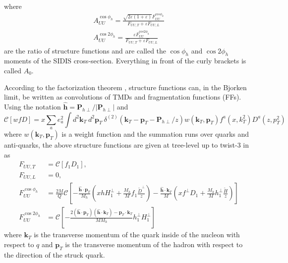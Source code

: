 where
\begin{equation}
\label{eq:moments}
\begin{split}
A^{\cos\phi_{h}}_{UU} = \frac{\sqrt{2 \varepsilon \left( 1 + \varepsilon \right)} F^{cos \phi_{h}}_{UU}}{F_{UU,T} + \varepsilon F_{UU,L}}
\\
A^{\cos2\phi_{h}}_{UU} = \frac{\varepsilon F^{cos2 \phi_{h}}_{UU}}{F_{UU,T} + \varepsilon F_{UU,L}}
\end{split}
\end{equation}
are the ratio of structure functions and are called the $\cos\phi_h$ and $\cos 2\phi_h$ moments of the SIDIS cross-section.
Everything in front of the curly brackets is called $A_0$.

According to the factorization theorem \cite{Collins88}\cite{Sterman95}, structure functions can, in the Bjorken limit, be written as convolutions of TMDs and fragmentation functions (FFs).
Using the notation $\hat{\textbf{h}} = \textbf{P}_{h\perp} / \left| \textbf{P}_{h\perp} \right|$ and
\begin{equation}
\label{eq:convolution}
\mathcal{C} \left[wfD\right] = x \sum_a e_a^2 \int d^2 \textbf{k}_T\ d^2 \textbf{p}_T\ \delta^{(2)} (\textbf{k}_T - \textbf{p}_T - \textbf{P}_{h\perp} / z) w(\textbf{k}_T, \textbf{p}_T) f^a(x, k_T^2) D^a(z, p_T^2)
\end{equation}
where $w(\textbf{k}_T, \textbf{p}_T)$ is a weight function and the summation runs over quarks and anti-quarks, the above structure functions are given at tree-level up to twist-3 in \cite{Bacchetta07} as
\begin{equation}
\label{eq:SFsAsConvolutions}
\begin{aligned}
F_{UU,T} &= \mathcal{C} \left[ f_1 D_1 \right],
\\
F_{UU,L} &= 0,
\\
F_{UU}^{\cos\phi_h} &= \frac{2M}{Q} \mathcal{C} \left[ - \frac{\hat{\textbf{h}} \cdot \textbf{p}_T}{M_h} \left( xhH_1^\perp + \frac{M_h}{M} f_1 \frac{\tilde{D}^\perp}{z} \right) - \frac{\hat{\textbf{h}} \cdot \textbf{k}_T}{M} \left( xf^\perp D_1 + \frac{M_h}{M} h_1^\perp \frac{\tilde{H}}{z} \right) \right]
\\
F_{UU}^{\cos2\phi_h} &= \mathcal{C} \left[ -\frac{2(\hat{\textbf{h}} \cdot \textbf{p}_T) (\hat{\textbf{h}} \cdot \textbf{k}_T) - \textbf{p}_T \cdot \textbf{k}_T}{MM_h} h_1^\perp H_1^\perp \right]
\end{aligned}
\end{equation}
where $\textbf{k}_T$ is the transverse momentum of the quark inside of the nucleon with respect to $q$ and $\textbf{p}_T$ is the transverse momentum of the hadron with respect to the direction of the struck quark.
